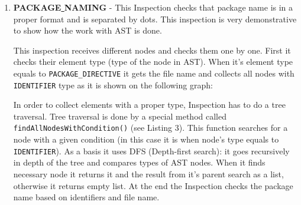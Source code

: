 \begin{enumerate}
    \item \textbf{PACKAGE\underline{ }NAMING} - This Inspection checks that package name is in a proper format and is separated by dots. This inspection is very demonstrative to show how the work with AST is done.
    
    This inspection receives different nodes and checks them one by one. First it checks their element type (type of the node in AST). When it's element type equals to \texttt{PACKAGE\_DIRECTIVE} it gets the file name and collects all nodes with \texttt{IDENTIFIER} type as it is shown on the following graph:
    
        
\begin{center}
\end{center}
    
In order to collect  elements with a proper type, Inspection has to do a tree traversal. Tree traversal is done by a special method called \texttt{findAllNodesWithCondition()} (see Listing 3). This function searches for a node with a given condition (in this case it is when node's type equals to \texttt{IDENTIFIER}). As a basis it uses DFS (Depth-first search): it goes recursively in depth of the tree and compares types of AST nodes. When it finds necessary node it returns it and the result from it's parent search as a list, otherwise it returns empty list. At the end the Inspection checks the package name based on identifiers and file name. 



\end{enumerate}
